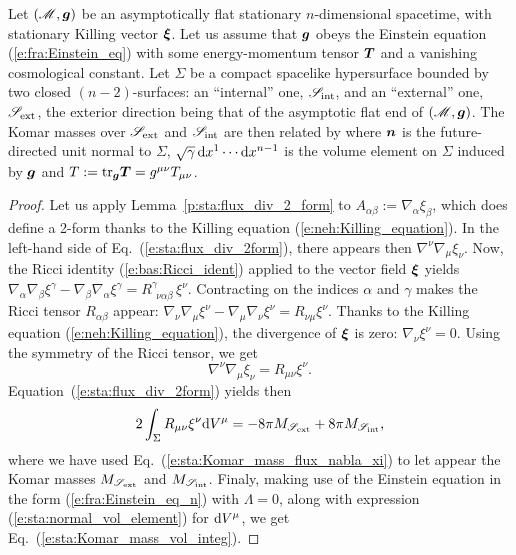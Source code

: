 \begin{prop}
\label{p:sta:Komar_mass_vol_integ}
Let $(\mathscr{M}, \bm{g})$ be an asymptotically flat stationary $n$-dimensional spacetime,
with stationary Killing vector $\bm{\xi}$. Let us assume that $\bm{g}$
obeys the Einstein equation (\ref{e:fra:Einstein_eq}) with some energy-momentum
tensor $\bm{T}$ and a vanishing cosmological constant.
Let $\Sigma$ be a compact spacelike hypersurface bounded by two closed $(n-2)$-surfaces:
an ``internal'' one, $\mathscr{S}_{\rm int}$, and an ``external'' one,
$\mathscr{S}_{\rm ext}$, the exterior direction being that of the asymptotic flat end of $(\mathscr{M}, \bm{g})$.
The Komar masses over $\mathscr{S}_{\rm ext}$ and $\mathscr{S}_{\rm int}$ are then
related by
\be \label{e:sta:Komar_mass_vol_integ}
\ee
where $\bm{n}$ is the future-directed unit normal to $\Sigma$,
$\sqrt{\gamma}\,\mathrm{d} x^1 \cdots \mathrm{d} x^{n-1}$ is the volume element on $\Sigma$
induced by $\bm{g}$ and $T:= \mathrm{tr}_{\bm{g}} \bm{T} = g^{\mu\nu} T_{\mu\nu}$.
\end{prop}
\begin{proof}
Let us apply Lemma~\ref{p:sta:flux_div_2_form} to $A_{\alpha\beta} := \nabla_\alpha \xi_\beta$,
which does define a 2-form thanks to the  Killing equation (\ref{e:neh:Killing_equation}).
In the left-hand side of Eq.~(\ref{e:sta:flux_div_2form}), there appears then
$\nabla^\nu \nabla_\mu \xi_\nu$. Now, the Ricci identity (\ref{e:bas:Ricci_ident})
applied to the vector field $\bm{\xi}$ yields
$\nabla_\alpha \nabla_\beta \xi^\gamma - \nabla_\beta \nabla_\alpha \xi^\gamma
= R^\gamma_{\ \  \nu \alpha\beta} \, \xi^\nu$. Contracting on the indices
$\alpha$ and $\gamma$ makes the Ricci tensor $R_{\alpha\beta}$ appear:
$\nabla_\nu \nabla_\mu \xi^\nu - \nabla_\mu \nabla_\nu \xi^\nu = R_{\nu\mu} \xi^\nu$.
Thanks to the Killing equation (\ref{e:neh:Killing_equation}), the divergence
of $\bm{\xi}$ is zero: $\nabla_\nu \xi^\nu = 0$. Using the symmetry of the Ricci tensor,
we get
\[
    \nabla^\nu \nabla_\mu \xi_\nu = R_{\mu\nu} \xi^\nu .
\]
Equation~(\ref{e:sta:flux_div_2form}) yields then
\[
    2 \int_{\Sigma} R_{\mu\nu} \xi^\nu \mathrm{d} V^\mu =
    - 8\pi M_{\mathscr{S}_{\rm ext}} + 8\pi M_{\mathscr{S}_{\rm int}} ,
\]
where we have used Eq.~(\ref{e:sta:Komar_mass_flux_nabla_xi})
to let appear the Komar masses $M_{\mathscr{S}_{\rm ext}}$ and $M_{\mathscr{S}_{\rm int}}$.
Finaly, making use of the Einstein equation in the form
(\ref{e:fra:Einstein_eq_n}) with $\Lambda=0$, along with expression
(\ref{e:sta:normal_vol_element}) for $\mathrm{d} V^\mu$, we get
Eq.~(\ref{e:sta:Komar_mass_vol_integ}).
\end{proof}

